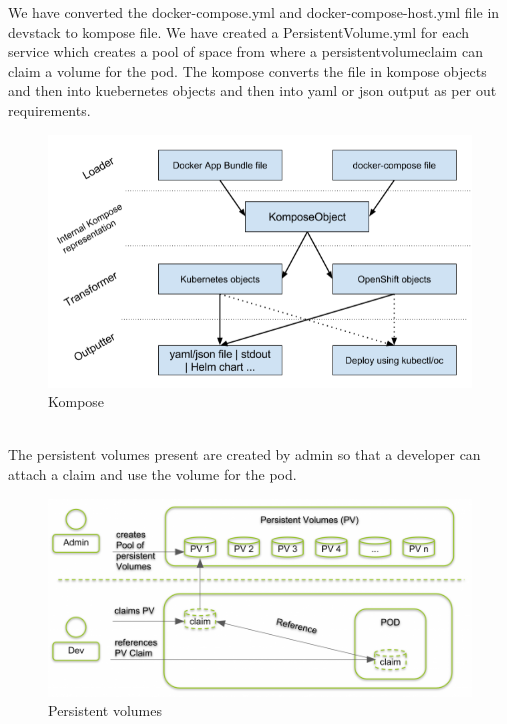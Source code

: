 \documentclass[12pt]{report}
\begin{document}
We have converted the docker-compose.yml and docker-compose-host.yml file in devstack to kompose file. We have created a PersistentVolume.yml for each service which creates a pool of space from where a persistentvolumeclaim can claim a volume for the pod. The kompose converts the file in kompose objects and then into kuebernetes objects and then into yaml or json output as per out requirements.
\begin{figure}[h!]
	\begin{center}
		\includegraphics[totalheight=0.38\textheight]{kompose}
		\caption{Kompose \cite{Kompose}}
	\end{center}
\end{figure}
\\The persistent volumes present are created by admin so that a developer can attach a claim and use the volume for the pod.
\begin{figure}[h!]
	\begin{center}
		\includegraphics[totalheight=0.33\textheight]{persistentvolumes}
		\caption{Persistent volumes \cite{Persistent}}
	\end{center}
\end{figure}
\\\\\\\\\\
\end{document}
